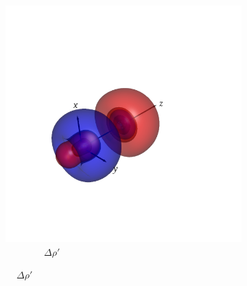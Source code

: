 \documentclass[journal=inoraj,manuscript=article]{achemso}
\begin{document}
\begin{figure}[!h]
    \centering
    \centering
    \begin{subfigure}[t]{0.30\textwidth}
        \centering
        \includegraphics[width=0.8\linewidth]{./AuHg+/diff_tot.png} 
        \caption*{\ \ \ \ \ \ \ \ $\Delta \rho'$} 
    \end{subfigure}
    \hfill
 

\end{figure}
\end{document}
